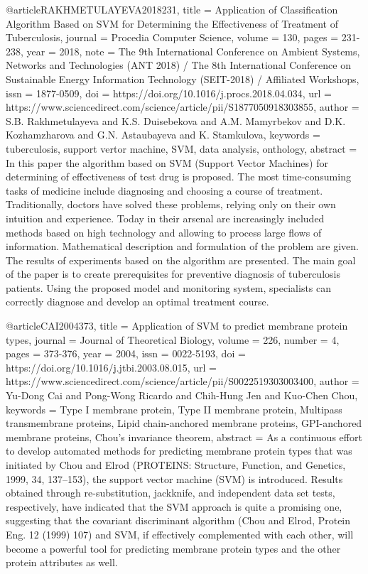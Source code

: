 \begin{thebibliography}{widestlabel}
@article{RAKHMETULAYEVA2018231,
	title = {Application of Classification Algorithm Based on SVM for Determining the Effectiveness of Treatment of Tuberculosis},
	journal = {Procedia Computer Science},
	volume = {130},
	pages = {231-238},
	year = {2018},
	note = {The 9th International Conference on Ambient Systems, Networks and Technologies (ANT 2018) / The 8th International Conference on Sustainable Energy Information Technology (SEIT-2018) / Affiliated Workshops},
	issn = {1877-0509},
	doi = {https://doi.org/10.1016/j.procs.2018.04.034},
	url = {https://www.sciencedirect.com/science/article/pii/S1877050918303855},
	author = {S.B. Rakhmetulayeva and K.S. Duisebekova and A.M. Mamyrbekov and D.K. Kozhamzharova and G.N. Astaubayeva and K. Stamkulova},
	keywords = {tuberculosis, support vertor machine, SVM, data analysis, onthology},
	abstract = {In this paper the algorithm based on SVM (Support Vector Machines) for determining of effectiveness of test drug is proposed. The most time-consuming tasks of medicine include diagnosing and choosing a course of treatment. Traditionally, doctors have solved these problems, relying only on their own intuition and experience. Today in their arsenal are increasingly included methods based on high technology and allowing to process large flows of information. Mathematical description and formulation of the problem are given. The results of experiments based on the algorithm are presented. The main goal of the paper is to create prerequisites for preventive diagnosis of tuberculosis patients. Using the proposed model and monitoring system, specialists can correctly diagnose and develop an optimal treatment course.}
}

@article{CAI2004373,
	title = {Application of SVM to predict membrane protein types},
	journal = {Journal of Theoretical Biology},
	volume = {226},
	number = {4},
	pages = {373-376},
	year = {2004},
	issn = {0022-5193},
	doi = {https://doi.org/10.1016/j.jtbi.2003.08.015},
	url = {https://www.sciencedirect.com/science/article/pii/S0022519303003400},
	author = {Yu-Dong Cai and Pong-Wong Ricardo and Chih-Hung Jen and Kuo-Chen Chou},
	keywords = {Type I membrane protein, Type II membrane protein, Multipass transmembrane proteins, Lipid chain-anchored membrane proteins, GPI-anchored membrane proteins, Chou's invariance theorem},
	abstract = {As a continuous effort to develop automated methods for predicting membrane protein types that was initiated by Chou and Elrod (PROTEINS: Structure, Function, and Genetics, 1999, 34, 137–153), the support vector machine (SVM) is introduced. Results obtained through re-substitution, jackknife, and independent data set tests, respectively, have indicated that the SVM approach is quite a promising one, suggesting that the covariant discriminant algorithm (Chou and Elrod, Protein Eng. 12 (1999) 107) and SVM, if effectively complemented with each other, will become a powerful tool for predicting membrane protein types and the other protein attributes as well.}
}


\end{thebibliography}
